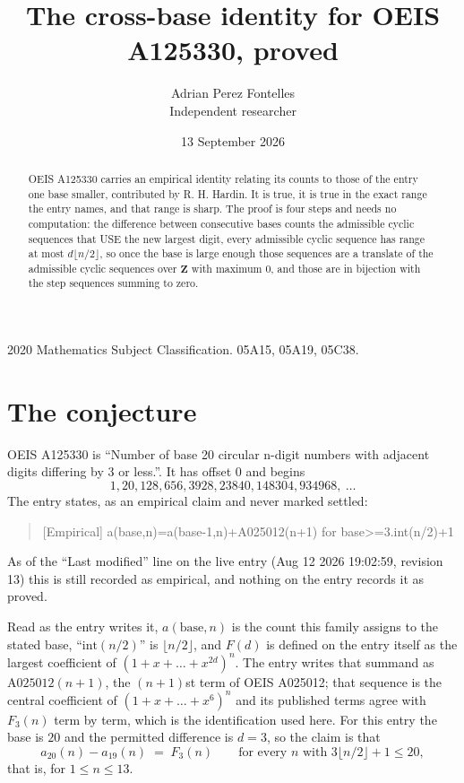 \documentclass[11pt,a4paper]{article}
\title{The cross-base identity for OEIS A125330, proved}
\author{Adrian Perez Fontelles\\ \small Independent researcher}
\date{13 September 2026}
\theoremstyle{plain}
\theoremstyle{definition}
\begin{document}
\maketitle

\begin{abstract}
OEIS A125330 carries an empirical identity relating its counts to those of the entry one base
smaller, contributed by R. H. Hardin. It is true, it is true in the exact range the entry
names, and that range is sharp. The proof is four steps and needs no computation: the
difference between consecutive bases counts the admissible cyclic sequences that USE the new
largest digit, every admissible cyclic sequence has range at most $d\lfloor n/2\rfloor$, so
once the base is large enough those sequences are a translate of the admissible cyclic
sequences over $\mathbf{Z}$ with maximum $0$, and those are in bijection with the step
sequences summing to zero.
\end{abstract}

\noindent\small 2020 Mathematics Subject Classification. 05A15, 05A19, 05C38.\normalsize

\section{The conjecture}

OEIS A125330 is ``Number of base 20 circular n-digit numbers with adjacent digits differing by 3 or less.''. It has offset $0$ and begins
\[
1, 20, 128, 656, 3928, 23840, 148304, 934968,\ \dots
\]
The entry states, as an empirical claim and never marked settled:
\begin{quote}
[Empirical] a(base,n)=a(base-1,n)+A025012(n+1) for base>=3.int(n/2)+1
\end{quote}
As of the ``Last modified'' line on the live entry (Aug 12 2026 19:02:59, revision 13)
this is still recorded as empirical, and nothing on the entry records it as proved.

Read as the entry writes it, $a(\mathrm{base},n)$ is the count this family assigns to the
stated base, ``$\mathrm{int}(n/2)$'' is $\lfloor n/2\rfloor$, and $F(d)$ is defined on the
entry itself as the largest coefficient of $(1+x+\dots+x^{2d})^{n}$. The entry writes that summand as $\mathrm{A025012}(n+1)$, the $(n+1)$st term of OEIS A025012; that sequence is the central coefficient of $(1+x+\dots+x^{6})^{n}$ and its published terms agree with $F_{3}(n)$ term by term, which is the identification used here. For this entry
the base is $20$ and the permitted difference is $d=3$, so the claim is that
\[
a_{20}(n)-a_{19}(n)\;=\;F_{3}(n)
\qquad\text{for every } n \text{ with } 3\lfloor n/2\rfloor+1\le20,
\]
that is, for $1\le n\le13$.
\end{document}

